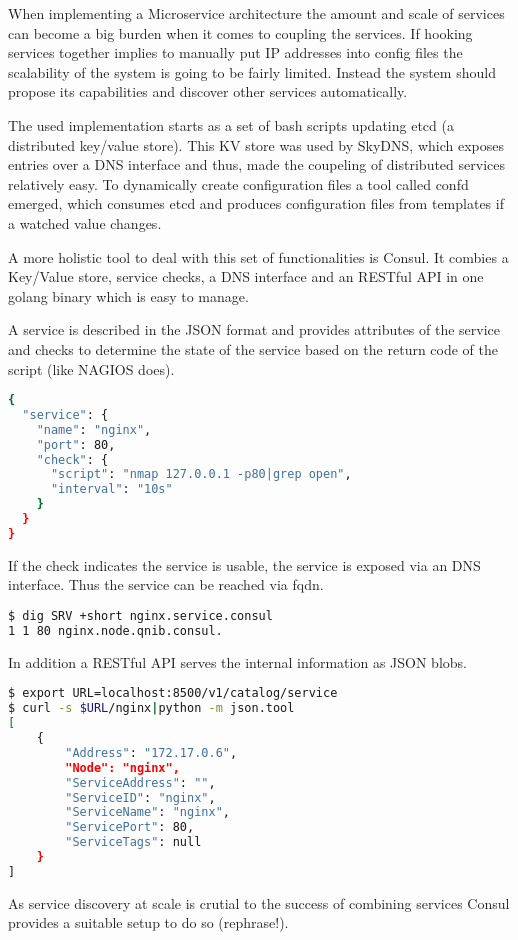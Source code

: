 When implementing a Microservice architecture the amount and scale of services can become a big burden when it comes to coupling the services.
If hooking services together implies to manually put IP addresses into config files the scalability of the system is going to be fairly limited.
Instead the system should propose its capabilities and discover other services automatically.

The used implementation starts as a set of bash scripts updating etcd (a distributed key/value store). This KV store was used by SkyDNS, which exposes entries
over a DNS interface and thus, made the coupeling of distributed services relatively easy. To dynamically create configuration files a tool called confd emerged, which consumes
etcd and produces configuration files from templates if a watched value changes.

A more holistic tool to deal with this set of functionalities is Consul. It combies a Key/Value store, service checks, a DNS interface and an RESTful API
in one golang binary which is easy to manage.

A service is described in the JSON format and provides attributes of the service and checks to determine the state of the service based on the return code of the script (like NAGIOS does).

\begin{lstlisting}[language=bash,
    caption={Service definition within consul.},
    label={lst:srv_json}]
{
  "service": {
    "name": "nginx",
    "port": 80,
    "check": {
      "script": "nmap 127.0.0.1 -p80|grep open",
      "interval": "10s"
    }
  }
}
\end{lstlisting}

If the check indicates the service is usable, the service is exposed via an DNS interface.
Thus the service can be reached via \gls{fqdn}.
\begin{lstlisting}[language=bash,
    caption={Exposure of services via DNS.},
    label={lst:dig_nginx}]
$ dig SRV +short nginx.service.consul
1 1 80 nginx.node.qnib.consul.
\end{lstlisting}

In addition a RESTful API serves the internal information as JSON blobs.

\begin{lstlisting}[language=bash,
    caption={Exposure of services via RESTful API.},
    label={lst:curl_nginx}]
$ export URL=localhost:8500/v1/catalog/service
$ curl -s $URL/nginx|python -m json.tool
[
    {
        "Address": "172.17.0.6",
        "Node": "nginx",
        "ServiceAddress": "",
        "ServiceID": "nginx",
        "ServiceName": "nginx",
        "ServicePort": 80,
        "ServiceTags": null
    }
]
\end{lstlisting}

As service discovery at scale is crutial to the success of combining services Consul provides a suitable setup to do so (rephrase!).
